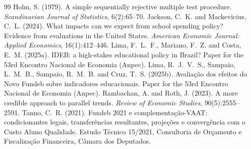 \documentclass[11pt]{article}
\begin{document}
\begin{thebibliography}{99}
 Holm, S. (1979). A simple sequentially rejective multiple test procedure. \textit{Scandinavian Journal of Statistics}, 6(2):65--70.
 Jackson, C.~K. and Mackevicius, C.~L. (2024). What impacts can we expect from school spending policy? Evidence from evaluations in the United States. \textit{American Economic Journal: Applied Economics}, 16(1):412--446.
 Lima, F.~L.~F., Mariano, F.~Z. and Costa, E.~M. (2025a). IDEB: a high-stakes educational policy in Brazil? Paper for the 53rd Encontro Nacional de Economia (Anpec).
 Lima, R.~J.~V.~S., Sampaio, L.~M.~B., Sampaio, R.~M.~B. and Cruz, T.~S. (2025b). Avaliação dos efeitos do Novo Fundeb sobre indicadores educacionais. Paper for the 53rd Encontro Nacional de Economia (Anpec).
 Rambachan, A. and Roth, J. (2023). A more credible approach to parallel trends. \textit{Review of Economic Studies}, 90(5):2555--2591.
 Tanno, C.~R. (2021). Fundeb 2021 e complementação-VAAT: condicionantes legais, transferências resultantes, projeções e convergência com o Custo Aluno Qualidade. Estudo Técnico 15/2021, Consultoria de Orçamento e Fiscalização Financeira, Câmara dos Deputados.
\end{thebibliography}
\end{document}
